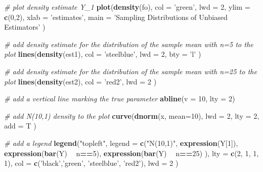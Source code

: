 \documentclass[]{book}
\newenvironment{Shaded}{\begin{snugshade}}{\end{snugshade}}
\newcommand{\KeywordTok}[1]{\textcolor[rgb]{0.13,0.29,0.53}{\textbf{#1}}}
\newcommand{\DataTypeTok}[1]{\textcolor[rgb]{0.13,0.29,0.53}{#1}}
\newcommand{\DecValTok}[1]{\textcolor[rgb]{0.00,0.00,0.81}{#1}}
\newcommand{\StringTok}[1]{\textcolor[rgb]{0.31,0.60,0.02}{#1}}
\newcommand{\CommentTok}[1]{\textcolor[rgb]{0.56,0.35,0.01}{\textit{#1}}}
\newcommand{\OperatorTok}[1]{\textcolor[rgb]{0.81,0.36,0.00}{\textbf{#1}}}
\newcommand{\NormalTok}[1]{#1}
\theoremstyle{definition}
\theoremstyle{definition}
\theoremstyle{definition}
\theoremstyle{remark}
\begin{document}
\begin{Shaded}
\begin{Highlighting}[]
\CommentTok{# plot density estimate Y_1}
\KeywordTok{plot}\NormalTok{(}\KeywordTok{density}\NormalTok{(fo), }
      \DataTypeTok{col =} \StringTok{'green'}\NormalTok{, }
      \DataTypeTok{lwd =} \DecValTok{2}\NormalTok{,}
      \DataTypeTok{ylim =} \KeywordTok{c}\NormalTok{(}\DecValTok{0}\NormalTok{,}\DecValTok{2}\NormalTok{),}
      \DataTypeTok{xlab =} \StringTok{'estimates'}\NormalTok{,}
      \DataTypeTok{main =} \StringTok{'Sampling Distributions of Unbiased Estimators'}
\NormalTok{      )}

\CommentTok{# add density estimate for the distribution of the sample mean with n=5 to the plot}
\KeywordTok{lines}\NormalTok{(}\KeywordTok{density}\NormalTok{(est1), }
     \DataTypeTok{col =} \StringTok{'steelblue'}\NormalTok{, }
     \DataTypeTok{lwd =} \DecValTok{2}\NormalTok{, }
     \DataTypeTok{bty =} \StringTok{'l'}
\NormalTok{     )}

\CommentTok{# add density estimate for the distribution of the sample mean with n=25 to the plot}
\KeywordTok{lines}\NormalTok{(}\KeywordTok{density}\NormalTok{(est2), }
      \DataTypeTok{col =} \StringTok{'red2'}\NormalTok{, }
      \DataTypeTok{lwd =} \DecValTok{2}
\NormalTok{      )}

\CommentTok{# add a vertical line marking the true parameter}
\KeywordTok{abline}\NormalTok{(}\DataTypeTok{v =} \DecValTok{10}\NormalTok{, }\DataTypeTok{lty =} \DecValTok{2}\NormalTok{)}

\CommentTok{# add N(10,1) density to the plot}
\KeywordTok{curve}\NormalTok{(}\KeywordTok{dnorm}\NormalTok{(x, }\DataTypeTok{mean=}\DecValTok{10}\NormalTok{), }
     \DataTypeTok{lwd =} \DecValTok{2}\NormalTok{,}
     \DataTypeTok{lty =} \DecValTok{2}\NormalTok{,}
     \DataTypeTok{add =}\NormalTok{ T}
\NormalTok{     )}

\CommentTok{# add a legend}
\KeywordTok{legend}\NormalTok{(}\StringTok{"topleft"}\NormalTok{,}
       \DataTypeTok{legend =} \KeywordTok{c}\NormalTok{(}\StringTok{"N(10,1)"}\NormalTok{,}
                  \KeywordTok{expression}\NormalTok{(Y[}\DecValTok{1}\NormalTok{]),}
                  \KeywordTok{expression}\NormalTok{(}\KeywordTok{bar}\NormalTok{(Y) }\OperatorTok{~}\StringTok{ }\NormalTok{n}\OperatorTok{==}\DecValTok{5}\NormalTok{),}
                  \KeywordTok{expression}\NormalTok{(}\KeywordTok{bar}\NormalTok{(Y) }\OperatorTok{~}\StringTok{ }\NormalTok{n}\OperatorTok{==}\DecValTok{25}\NormalTok{)}
\NormalTok{                  ), }
       \DataTypeTok{lty =} \KeywordTok{c}\NormalTok{(}\DecValTok{2}\NormalTok{, }\DecValTok{1}\NormalTok{, }\DecValTok{1}\NormalTok{, }\DecValTok{1}\NormalTok{), }
       \DataTypeTok{col =} \KeywordTok{c}\NormalTok{(}\StringTok{'black'}\NormalTok{,}\StringTok{'green'}\NormalTok{, }\StringTok{'steelblue'}\NormalTok{, }\StringTok{'red2'}\NormalTok{),}
       \DataTypeTok{lwd =} \DecValTok{2}
\NormalTok{       )}
\end{Highlighting}
\end{Shaded}
\end{document}
